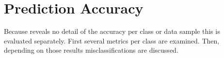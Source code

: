 \section{Prediction Accuracy}
\label{sec:results-predictions}
Because  reveals no detail of the accuracy per class or data sample this is evaluated separately.
First several metrics per class are examined.
Then, depending on those results misclassifications are discussed.


